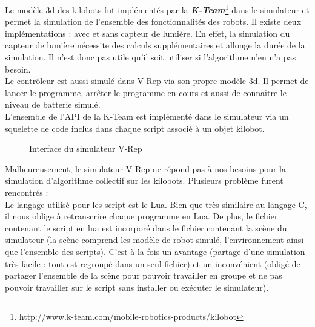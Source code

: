 \documentclass[a4paper,8pt]{report}
\begin{document}
\medskip
Le mod\`ele 3d des kilobots fut impl\'ement\'es par la \textit{\textbf{K-Team}}\footnote{http://www.k-team.com/mobile-robotics-products/kilobot} dans le simulateur et permet la simulation de l'ensemble des fonctionnalit\'es des robots. Il existe deux impl\'ementations : avec et sans capteur de lumi\`ere. En effet, la simulation du capteur de lumi\`ere n\'ecessite des calculs suppl\'ementaires et allonge la dur\'ee de la simulation. Il n'est donc pas utile qu'il soit utiliser si l'algorithme n'en n'a pas besoin. \\
Le contr\^oleur est aussi simul\'e dans V-Rep via son propre mod\`ele 3d. Il permet de lancer le programme, arr\^eter le programme en cours et aussi de conna\^itre le niveau de batterie simul\'e. \\
L'ensemble de l'API de la K-Team est impl\'ement\'e dans le simulateur via un squelette de code inclus dans chaque script associ\'e \`a un objet kilobot.\\

\begin{figure}[!h]
    \centering
    \caption{Interface du simulateur V-Rep}
\end{figure}

\medskip
Malheureusement, le simulateur V-Rep ne r\'epond pas \`a nos besoins pour la simulation d'algorithme collectif sur les kilobots. Plusieurs probl\`eme furent rencontr\'es : \\ 

\medskip
Le langage utilis\'e pour les script est le Lua. Bien que tr\`es similaire au langage C, il nous oblige \`a retranscrire chaque programme en Lua. De plus, le fichier contenant le script en lua est incorpor\'e dans le fichier contenant la sc\`ene du simulateur (la sc\`ene comprend les mod\`ele de robot simul\'e, l'environnement ainsi que l'ensemble des scripts). C'est \`a la fois un avantage (partage d'une simulation tr\`es facile : tout est regroup\'e dans un seul fichier) et un inconv\'enient (oblig\'e de partager l'ensemble de la sc\`ene pour pouvoir travailler en groupe et ne pas pouvoir travailler sur le script sans installer ou ex\'ecuter le simulateur).\\
\end{document}
